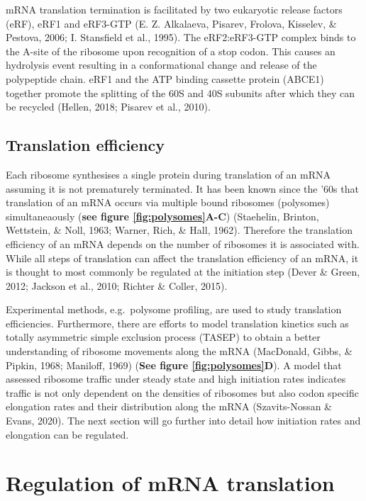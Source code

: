 \documentclass[12pt,openany]{book}
\begin{document}
mRNA translation termination is facilitated by two eukaryotic release
factors (eRF), eRF1 and eRF3-GTP (E. Z. Alkalaeva, Pisarev, Frolova,
Kisselev, \& Pestova, 2006; I. Stansfield et al., 1995). The
eRF2:eRF3-GTP complex binds to the A-site of the ribosome upon
recognition of a stop codon. This causes an hydrolysis event resulting
in a conformational change and release of the polypeptide chain. eRF1
and the ATP binding cassette protein (ABCE1) together promote the
splitting of the 60S and 40S subunits after which they can be recycled
(Hellen, 2018; Pisarev et al., 2010).

\subsection{Translation efficiency}

Each ribosome synthesises a single protein during translation of an mRNA
assuming it is not prematurely terminated. It has been known since the
'60s that translation of an mRNA occurs via multiple bound ribosomes
(polysomes) simultaneaously (\textbf{see figure \ref{fig:polysomes}A-C})
(Staehelin, Brinton, Wettstein, \& Noll, 1963; Warner, Rich, \& Hall,
1962). Therefore the translation efficiency of an mRNA depends on the
number of ribosomes it is associated with. While all steps of
translation can affect the translation efficiency of an mRNA, it is
thought to most commonly be regulated at the initiation step (Dever \&
Green, 2012; Jackson et al., 2010; Richter \& Coller, 2015).

Experimental methods, e.g.~polysome profiling, are used to study
translation efficiencies. Furthermore, there are efforts to model
translation kinetics such as totally asymmetric simple exclusion process
(TASEP) to obtain a better understanding of ribosome movements along the
mRNA (MacDonald, Gibbs, \& Pipkin, 1968; Maniloff, 1969) (\textbf{See
figure \ref{fig:polysomes}D}). A model that assessed ribosome traffic
under steady state and high initiation rates indicates traffic is not
only dependent on the densities of ribosomes but also codon specific
elongation rates and their distribution along the mRNA (Szavits-Nossan
\& Evans, 2020). The next section will go further into detail how
initiation rates and elongation can be regulated. \newline
\section{Regulation of mRNA translation} \label{regmRNA}
\end{document}
